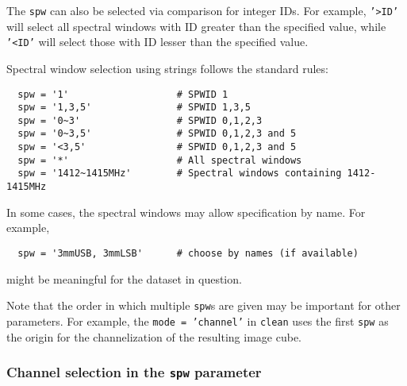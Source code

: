 The {\tt spw} can also be selected via comparison for
integer IDs.  For example, {\tt '>ID'} will select all spectral
windows with ID greater than the specified value, while {\tt '<ID'}
will select those with ID lesser than the specified value.

Spectral window selection using strings follows the standard rules:
\small
\begin{verbatim}
  spw = '1'                   # SPWID 1
  spw = '1,3,5'               # SPWID 1,3,5
  spw = '0~3'                 # SPWID 0,1,2,3
  spw = '0~3,5'               # SPWID 0,1,2,3 and 5
  spw = '<3,5'                # SPWID 0,1,2,3 and 5
  spw = '*'                   # All spectral windows
  spw = '1412~1415MHz'        # Spectral windows containing 1412-1415MHz
\end{verbatim}
\normalsize


In some cases, the spectral windows may allow specification by name.
For example,
\small
\begin{verbatim}
  spw = '3mmUSB, 3mmLSB'      # choose by names (if available)
\end{verbatim}
\normalsize
might be meaningful for the dataset in question.

Note that the order in which multiple {\tt spw}s are given may be
important for other parameters.
For example, the {\tt mode = 'channel'} in {\tt clean} uses the
first {\tt spw} as the origin for the channelization of the resulting
image cube.

\subsubsection{Channel selection in the {\tt spw} parameter}
\label{section:io.selection.spw.channel}

